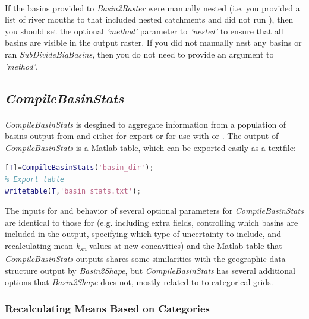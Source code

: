\paragraph{}If the basins provided to \textit{Basin2Raster} were manually nested (i.e. you provided a list of river mouths to  that included nested catchments and did not run ), then you should set the optional \textit{'method'} parameter to \textit{'nested'} to ensure that all basins are visible in the output raster. If you did not manually nest any basins or ran \textit{SubDivideBigBasins}, then you do not need to provide an argument to \textit{'method'}.

\subsection{\textit{CompileBasinStats}} \label{sec:CompStats}
\paragraph{}\textit{CompileBasinStats} is desgined to aggregate information from a population of basins output from  and  either for export or for use with  or . The output of \textit{CompileBasinStats} is a Matlab table, which can be exported easily as a textfile:

\begin{lstlisting}[language=Matlab]
% Generate basin stats table
[T]=CompileBasinStats('basin_dir');
% Export table
writetable(T,'basin_stats.txt');
\end{lstlisting}

\noindent
The inputs for and behavior of several optional parameters for \textit{CompileBasinStats} are identical to those for  (e.g. including extra fields, controlling which basins are included in the output, specifying which type of uncertainty to include, and recalculating mean \textit{k\textsubscript{sn}} values at new concavities) and the Matlab table that \textit{CompileBasinStats} outputs shares some similarities with the geographic data structure output by \textit{Basin2Shape}, but \textit{CompileBasinStats} has several additional options that \textit{Basin2Shape} does not, mostly related to to categorical grids.

\subsubsection{Recalculating Means Based on Categories}

